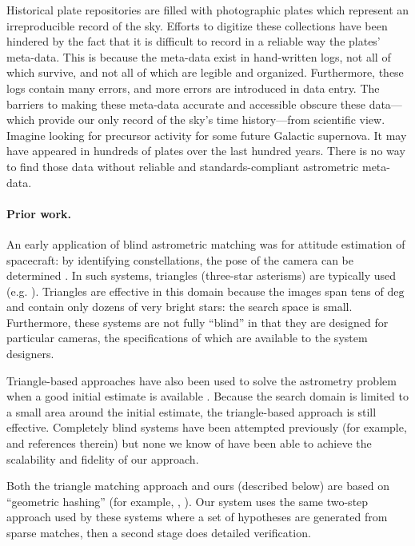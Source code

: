 \documentclass[12pt,preprint]{aastex}
\newcommand{\unit}[1]{\mathrm{#1}}
\renewcommand{\%}{\percent}
\renewcommand{\deg}{\unit{deg}}
\begin{document}
Historical plate repositories are filled with photographic plates
which represent an irreproducible record of the sky.  Efforts to digitize
these collections have been hindered by the fact that it is difficult to
record in a reliable way the plates' meta-data.
This is because the meta-data exist in hand-written logs, not all of
which survive, and not all of which are legible and organized.
Furthermore, these logs contain many errors, and more errors are
introduced in data entry.  The barriers to making these meta-data
accurate and accessible obscure these data---which provide our only
record of the sky's time history---from scientific view.  Imagine
looking for precursor activity for some future Galactic supernova.  It
may have appeared in hundreds of plates over the last hundred years.
There is no way to find those data without reliable and
standards-compliant astrometric meta-data.

\paragraph{Prior work.}
An early application of blind astrometric matching was for attitude
estimation of spacecraft: by identifying constellations, the pose of
the camera can be determined \citep{liebe1993}.  In such systems,
triangles (three-star asterisms) are typically used
(e.g. \citealt{junkins1977}).  Triangles are effective in this domain
because the images span tens of $\deg$ and contain only dozens of
very bright stars: the search space is small.  Furthermore, these
systems are not fully ``blind'' in that they are designed for
particular cameras, the specifications of which are available to the
system designers.

Triangle-based approaches have also been used to solve the astrometry
problem when a good initial estimate is available \citep{palbakos}.
Because the search domain is limited to a small area around the
initial estimate, the triangle-based approach is still effective.
Completely blind systems have been attempted previously (for example,
\citealt{harvey} and references therein) but none we know of have been
able to achieve the scalability and fidelity of our approach.

Both the triangle matching approach and ours (described below) are
based on ``geometric hashing'' (for example, \citealt{lamdan1990},
\citealt{huttenlocher1990}).  Our system uses the same two-step
approach used by these systems where a set of hypotheses are generated
from sparse matches, then a second stage does detailed verification.
\end{document}
